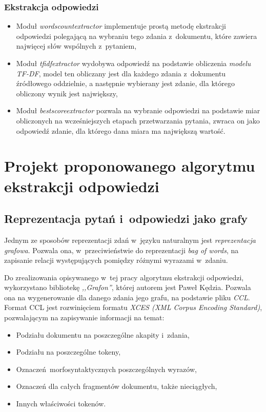 \documentclass[a4paper, twoside, openright, 12pt]{report}
\begin{document}
        \subsection{Ekstrakcja odpowiedzi}
            \begin{itemize}
                \item Moduł \emph{wordscountextractor} implementuje prostą metodę ekstrakcji odpowiedzi polegającą na
                    wybraniu tego zdania z~dokumentu, które zawiera najwięcej słów wspólnych z~pytaniem,
                \item Moduł \emph{tfidfextractor} wydobywa odpowiedź na podstawie obliczenia \emph{modelu TF-DF}, model
                    ten obliczany jest dla każdego zdania z~dokumentu źródłowego oddzielnie, a następnie wybierany
                    jest zdanie, dla którego obliczony wynik jest największy,
                \item Moduł \emph{bestscoreextractor} pozwala na wybranie odpowiedzi na podstawie miar obliczonych na
                    wcześniejszych etapach przetwarzania pytania, zwraca on jako odpowiedź zdanie, dla którego dana
                    miara ma największą wartość.
            \end{itemize}



\chapter{Projekt proponowanego algorytmu ekstrakcji odpowiedzi}
    \section{Reprezentacja pytań i~odpowiedzi jako grafy}
        Jednym ze sposobów reprezentacji zdań w~języku naturalnym jest \emph{reprezentacja grafowa}. Pozwala ona, w~przeciwieństwie
        do reprezentacji \emph{bag of words}, na zapisanie relacji występujących pomiędzy różnymi wyrazami w~zdaniu.

        Do zrealizowania opisywanego w~tej pracy algorytmu ekstrakcji odpowiedzi, wykorzystano bibliotekę \emph{,,Grafon''},
        której autorem jest Paweł Kędzia.
        Pozwala ona na wygenerowanie dla danego zdania jego grafu, na podstawie pliku \emph{CCL}. Format CCL jest
        rozwinięciem formatu \emph{XCES (XML Corpus Encoding Standard)}, pozwalającym na zapisywanie informacji na temat:
        \begin{itemize}
            \item Podziału dokumentu na poszczególne akapity i~zdania,
            \item Podziału na poszczególne tokeny,
            \item Oznaczeń morfosyntaktycznych poszczególnych wyrazów,
            \item Oznaczeń dla całych fragmentów dokumentu, także nieciągłych,
            \item Innych właściwości tokenów.
        \end{itemize}
\end{document}
